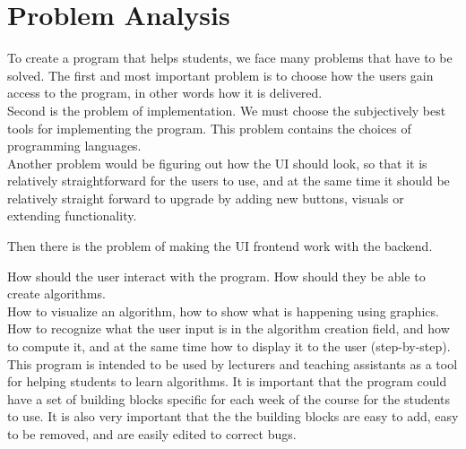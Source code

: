 \documentclass[11pt]{article}
\begin{document}
\section{Problem Analysis}

To create a program that helps students, we face many problems that have to be solved. The first and most important problem is to choose how the users gain access to the program, in other words how it is delivered.
\\

Second is the problem of implementation. We must choose the subjectively best tools for implementing the program. This problem contains the choices of programming languages.
\\

Another problem would be figuring out how the UI should look, so that it is relatively straightforward for the users to use, and at the same time it should be relatively straight forward to upgrade by adding new buttons, visuals or extending functionality.

Then there is the problem of making the UI frontend work with the backend.

\noindent How should the user interact with the program. How should they be able to create algorithms.\\
How to visualize an algorithm, how to show what is happening using graphics.\\
How to recognize what the user input is in the algorithm creation field, and how to compute it, and at the same time how to display it to the user (step-by-step).\\

\noindent This program is intended to be used by lecturers and teaching assistants as a tool for helping students to learn algorithms. It is important that the program could have a set of building blocks specific for each week of the course for the students to use. It is also very important that the the building blocks are easy to add, easy to be removed, and are easily edited to correct bugs. 
\end{document}
